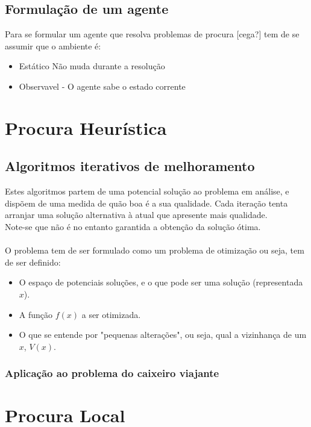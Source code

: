 \documentclass[]{report}
\begin{document}
\section{Formulação de um agente}
Para se formular um agente que resolva problemas de procura [cega?] tem de se assumir que o ambiente é:
\begin{itemize}
\item Estático
Não muda durante a resolução\\
\item Observavel - O agente sabe o estado corrente
\end{itemize}
\chapter{Procura Heurística}
\section{Algoritmos iterativos de melhoramento}
Estes algoritmos partem de uma potencial solução ao problema em análise, e dispõem de uma medida de quão boa é a sua qualidade. Cada iteração tenta arranjar uma solução alternativa à atual que apresente mais qualidade.\\
Note-se que não é no entanto garantida a obtenção da solução ótima.\\\\
O problema tem de ser formulado como um problema de otimização ou seja, tem de ser definido:
\begin{itemize}
\item O espaço de potenciais soluções, e o que pode ser uma solução (representada $x$).
\item A função $f(x)$ a ser otimizada.
\item O que se entende por "pequenas alterações", ou seja, qual a vizinhança de um $x$, $V(x)$.
\end{itemize}

\subsection{Aplicação ao problema do caixeiro viajante}

\chapter{Procura Local}
\end{document}
